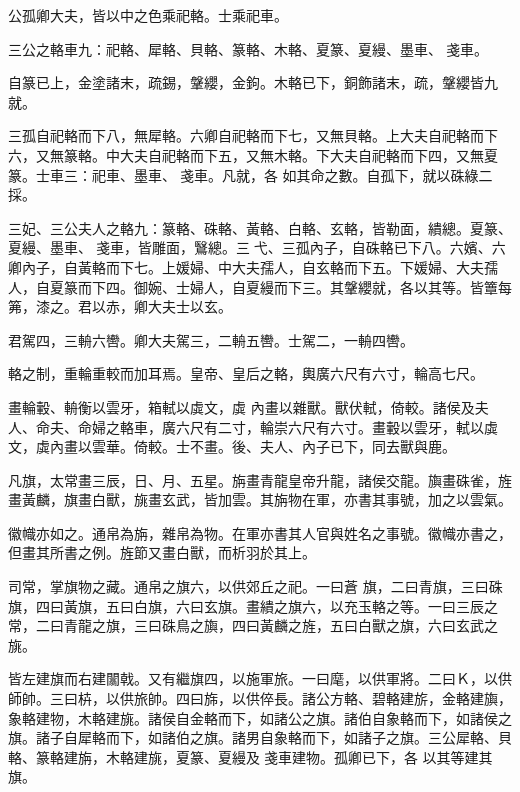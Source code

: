 \begin{pinyinscope}
 公孤卿大夫，皆以中之色乘祀輅。士乘祀車。



 三公之輅車九：祀輅、犀輅、貝輅、篆輅、木輅、夏篆、夏縵、墨車、戔車。



 自篆已上，金塗諸末，疏錫，鞶纓，金鉤。木輅已下，銅飾諸末，疏，鞶纓皆九就。



 三孤自祀輅而下八，無犀輅。六卿自祀輅而下七，又無貝輅。上大夫自祀輅而下六，又無篆輅。中大夫自祀輅而下五，又無木輅。下大夫自祀輅而下四，又無夏篆。士車三：祀車、墨車、戔車。凡就，各
 如其命之數。自孤下，就以硃綠二採。



 三妃、三公夫人之輅九：篆輅、硃輅、黃輅、白輅、玄輅，皆勒面，繢總。夏篆、夏縵、墨車、戔車，皆雕面，鷖總。三弋、三孤內子，自硃輅已下八。六嬪、六卿內子，自黃輅而下七。上媛婦、中大夫孺人，自玄輅而下五。下媛婦、大夫孺人，自夏篆而下四。御婉、士婦人，自夏縵而下三。其鞶纓就，各以其等。皆簟每笰，漆之。君以赤，卿大夫士以玄。



 君駕四，三輈六轡。卿大夫駕三，二輈五轡。士駕二，一輈四轡。



 輅之制，重輪重較而加耳焉。皇帝、皇后之輅，輿廣六尺有六寸，輪高七尺。



 畫輪轂、輈衡以雲牙，箱軾以虡文，虡
 內畫以雜獸。獸伏軾，倚較。諸侯及夫人、命夫、命婦之輅車，廣六尺有二寸，輪崇六尺有六寸。畫轂以雲牙，軾以虡文，虡內畫以雲華。倚較。士不畫。後、夫人、內子已下，同去獸與鹿。



 凡旗，太常畫三辰，日、月、五星。旃畫青龍皇帝升龍，諸侯交龍。旟畫硃雀，旌畫黃麟，旗畫白獸，旐畫玄武，皆加雲。其旃物在軍，亦書其事號，加之以雲氣。



 徽幟亦如之。通帛為旃，雜帛為物。在軍亦書其人官與姓名之事號。徽幟亦書之，但畫其所書之例。旌節又畫白獸，而析羽於其上。



 司常，掌旗物之藏。通帛之旗六，以供郊丘之祀。一曰蒼
 旗，二曰青旗，三曰硃旗，四曰黃旗，五曰白旗，六曰玄旗。畫繢之旗六，以充玉輅之等。一曰三辰之常，二曰青龍之旗，三曰硃鳥之旟，四曰黃麟之旌，五曰白獸之旗，六曰玄武之旐。



 皆左建旗而右建闟戟。又有繼旗四，以施軍旅。一曰麾，以供軍將。二曰Ｋ，以供師帥。三曰枿，以供旅帥。四曰旆，以供倅長。諸公方輅、碧輅建旂，金輅建旟，象輅建物，木輅建旐。諸侯自金輅而下，如諸公之旗。諸伯自象輅而下，如諸侯之旗。諸子自犀輅而下，如諸伯之旗。諸男自象輅而下，如諸子之旗。三公犀輅、貝輅、篆輅建旃，木輅建旐，夏篆、夏縵及戔車建物。孤卿已下，各
 以其等建其旗。




\end{pinyinscope}
